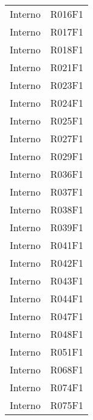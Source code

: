 \documentclass[../analisi-dei-requisiti.tex]{subfiles}
\begin{document}
\begin{longtable}[H]{ p{3cm} | p{4cm} }
  Interno                       & R016F1                               \\
  Interno                       & R017F1                               \\
  Interno                       & R018F1                               \\
  Interno                       & R021F1                               \\
  Interno                       & R023F1                               \\
  Interno                       & R024F1                               \\
  Interno                       & R025F1                               \\
  Interno                       & R027F1                               \\
  Interno                       & R029F1                               \\
  Interno                       & R036F1                               \\
  Interno                       & R037F1                               \\
  Interno                       & R038F1                               \\
  Interno                       & R039F1                               \\
  Interno                       & R041F1                               \\
  Interno                       & R042F1                               \\
  Interno                       & R043F1                               \\
  Interno                       & R044F1                               \\
  Interno                       & R047F1                               \\
  Interno                       & R048F1                               \\
  Interno                       & R051F1                               \\
  Interno                       & R068F1                               \\
  Interno                       & R074F1                               \\
  Interno                       & R075F1                               \\

\end{longtable}
\end{document}
